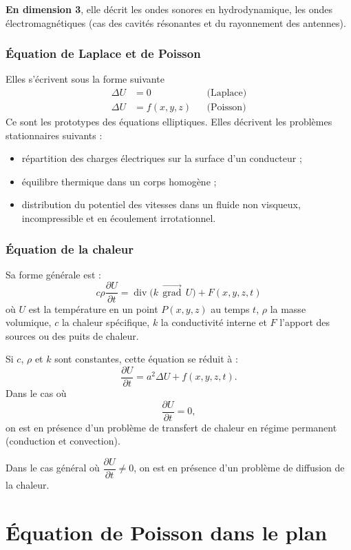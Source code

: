 \textbf{En dimension 3}, elle décrit les ondes sonores en hydrodynamique, les
ondes électromagnétiques (cas des cavités résonantes et du rayonnement des
antennes).

\subsubsection{Équation de Laplace et de Poisson}

Elles s'écrivent sous la forme suivante
\[
  \begin{aligned}
    \Delta U &= 0 && \text{(Laplace)}\\
    \Delta U &= f(x, y, z) && \text{(Poisson)}
  \end{aligned}
\]
Ce sont les prototypes des équations elliptiques. Elles décrivent les
problèmes stationnaires suivants :
\begin{itemize}[label=--]
  \item répartition des charges électriques sur la surface d'un conducteur ;
  \item équilibre thermique dans un corps homogène ;
  \item distribution du potentiel des vitesses dans un fluide non visqueux,
        incompressible et en écoulement irrotationnel.
\end{itemize}

\subsubsection{Équation de la chaleur}

Sa forme générale est :
\[
  c\rho\frac{\partial U}{\partial t} = \operatorname{div}\bigl(k\,\overrightarrow{\operatorname{grad}}\,U\bigr)
  + F(x, y, z, t)
\]
où $U$ est la température en un point $P(x, y, z)$ au temps $t$, $\rho$ la
masse volumique, $c$ la chaleur spécifique, $k$ la conductivité interne et $F$
l'apport des sources ou des puits de chaleur.

Si $c$, $\rho$ et $k$ sont constantes, cette équation se réduit à :
\[
  \frac{\partial U}{\partial t} = a^2\Delta U + f(x, y, z, t) .
\]
Dans le cas où
\[
  \frac{\partial U}{\partial t} = 0,
\]
on est en présence d'un problème de transfert de chaleur en régime permanent
(conduction et convection).

Dans le cas général où $\dfrac{\partial U}{\partial t} \neq 0$, on est en
présence d'un problème de diffusion de la chaleur.

\section{Équation de Poisson dans le plan}

